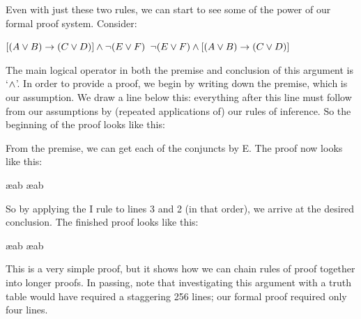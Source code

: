 Even with just these two rules, we can start to see some of the power of our formal proof system. Consider:
\begin{earg}
\prem $[(A\vee B)\rightarrow(C\vee D)] \mathbin{\wedge} \neg(E\vee F)$
\conc $\neg(E\vee F) \mathbin{\wedge} [(A\vee B)\rightarrow(C\vee D)]$
\end{earg}
The main logical operator in both the premise and conclusion of this argument is `$\mathbin{\wedge}$'. In order to provide a proof, we begin by writing down the premise, which is our assumption. We draw a line below this: everything after this line must follow from our assumptions by (repeated applications of) our rules of inference. So the beginning of the proof looks like this:
\begin{pf}
\end{pf}
From the premise, we can get each of the conjuncts by {\eand}E. The proof now looks like this:
\begin{pf}
	 \ae{ab}
	 \ae{ab}
\end{pf}
So by applying the {\eand}I rule to lines 3 and 2 (in that order), we arrive at the desired conclusion. The finished proof looks like this:
\begin{pf}

	 \ae{ab}
	 \ae{ab}
	 
\end{pf}
This is a very simple proof, but it shows how we can chain rules of proof together into longer proofs. In passing, note that investigating this argument with a truth table would have required a staggering 256 lines; our formal proof required only four lines.

